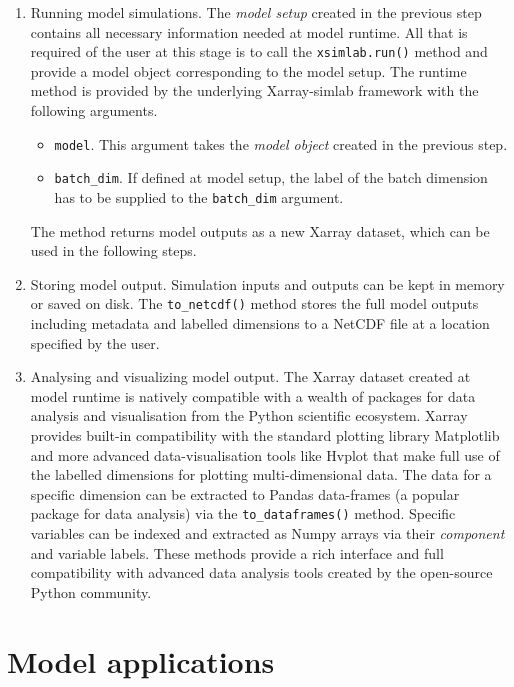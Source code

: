 \documentclass[journal abbreviation, manuscript]{copernicus}
\begin{document}
\begin{enumerate}
    \item Running model simulations. The \textit{model setup} created in the previous step contains all necessary information needed at model runtime. All that is required of the user at this stage is to call the \texttt{xsimlab.run()} method and provide a model object corresponding to the model setup. The runtime method is provided by the underlying Xarray-simlab framework with the following arguments.
    \begin{itemize}
        \item \texttt{model}. This argument takes the \textit{model object} created in the previous step.
        \item \texttt{batch\_dim}. If defined at model setup, the label of the batch dimension has to be supplied to the \texttt{batch\_dim} argument.
    \end{itemize}
    The method returns model outputs as a new Xarray dataset, which can be used in the following steps.
    
    \item Storing model output. Simulation inputs and outputs can be kept in memory or saved on disk. The \texttt{to\_netcdf()} method stores the full model outputs including metadata and labelled dimensions to a NetCDF file at a location specified by the user.
    
    \item Analysing and visualizing model output. The Xarray dataset created at model runtime is natively compatible with a wealth of packages for data analysis and visualisation from the Python scientific ecosystem. Xarray provides built-in compatibility with the standard plotting library Matplotlib and more advanced data-visualisation tools like Hvplot that make full use of the labelled dimensions for plotting multi-dimensional data. The data for a specific dimension can be extracted to Pandas data-frames (a popular package for data analysis) via the \texttt{to\_dataframes()} method. Specific variables can be indexed and extracted as Numpy arrays via their \textit{component} and variable labels. These methods provide a rich interface and full compatibility with advanced data analysis tools created by the open-source Python community.

\end{enumerate}


\section{Model applications} \label{Section:UseCases}
\end{document}
